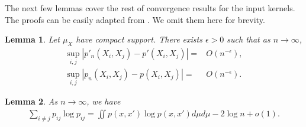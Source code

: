 \documentclass[10pt]{article}
\newtheorem{lemma}{\bf Lemma}
\newenvironment{Proof of lemma}{\noindent{\bf Proof of Lemma}}{\hfill$\Box$\newline}
\newenvironment{Proof of claim}{\noindent{\bf Proof of claim}}{\hfill$\Box$\newline}
\newenvironment{Proof of theorem}{\noindent{\bf Proof of Theorem}}{\hfill\scriptsize{$\Box$}\newline}
\newenvironment{Proof of theorems}{\noindent{\bf Proof of Theorems}}{\hfill$\Box$\newline}
\newenvironment{Proof of proposition}{\noindent{\bf Proof of Proposition}}{\hfill$\Box$\newline}
\newenvironment{Proof of propositions}{\noindent{\bf Proof of Propositions}}{\hfill$\Box$\newline}
\newenvironment{Proof of exercise}{\noindent{\it Proof of Exercise:}}{\hfill$\Box$}
\numberwithin{equation}{section}
\begin{document}
The next few lemmas cover the rest of convergence results for the input
kernels. The proofs can be easily adapted from \cite{auffinger-tsne}. We omit them here for
brevity.
\begin{lemma} \label{tsne:integrand_lemma_2}
    Let $\mu_X$ have compact support. There exists $\epsilon>0$ such that as $n \to \infty$,
    \begin{align}
        \sup_{i,j} \left|p'_n(X_i,X_j) - p'(X_i,X_j)\right| = & O(n^{-\epsilon}), \nonumber \\
        \sup_{i,j} \left|p_n(X_i,X_j) - p(X_i,X_j)\right| =   & O(n^{-\epsilon}) \nonumber.
    \end{align}
\end{lemma}
\begin{lemma} \label{entropy_lemma_1}
    As $n \to \infty$, we have
    \begin{align}
        \sum_{i \neq j} p_{ij} \log p_{ij} = \iint p(x,x')\log p(x,x')d\mu d\mu - 2 \log n + o(1).
    \end{align}
\end{lemma}
\end{document}
